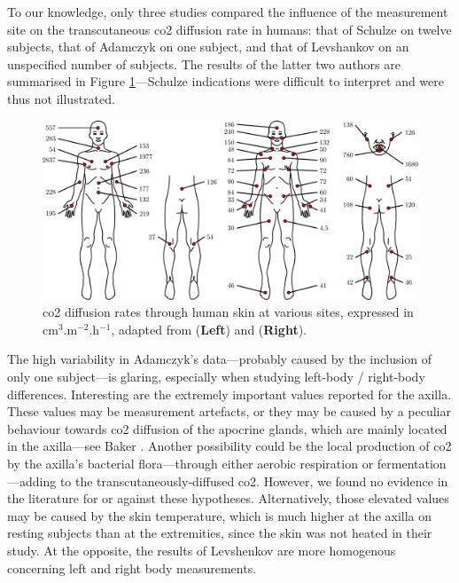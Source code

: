 To our knowledge, only three studies compared the influence of the measurement site on the transcutaneous \gls{co2} diffusion rate in humans: that of Schulze on twelve subjects\cite[Table~16]{schulze1943}, that of Adamczyk \etal{}\cite{adamczyk1966} on one subject, and that of Levshankov \etal{}\cite{levshankov1983} on an unspecified number of subjects. The results of the latter two authors are summarised in Figure \ref{fig:tcco2:positioning}---Schulze indications were difficult to interpret and were thus not illustrated.

\begin{figure}
	\centering
	\includegraphics[width=\linewidth]{1_main_matter/tcco2_figures/positioning.pdf}
	\caption[\gls{co2} diffusion rates through human skin at various sites retrieved from the literature.]{\gls{co2} diffusion rates through human skin at various sites, expressed in cm$^3$.m$^{-2}$.h$^{-1}$, adapted from \cite{adamczyk1966} (\textbf{Left}) and \cite{levshankov1983} (\textbf{Right}).}\label{fig:tcco2:positioning}
\end{figure}

The high variability in Adamczyk's data---probably caused by the inclusion of only one subject---is glaring, especially when studying left-body / right-body differences. Interesting are the extremely important values reported for the axilla. These values may be measurement artefacts, or they may be caused by a peculiar behaviour towards \gls{co2} diffusion of the apocrine glands, which are mainly located in the axilla---see Baker \etal{}\cite{baker2019}. Another possibility could be the local production of \gls{co2} by the axilla's bacterial flora---through either aerobic respiration or fermentation---adding to the transcutaneously-diffused \gls{co2}\cite{taylor2003}. However, we found no evidence in the literature for or against these hypotheses. Alternatively, those elevated values may be caused by the skin temperature, which is much higher at the axilla on resting subjects than at the extremities\cite{niu2001, sund2002}, since the skin was not heated in their study. At the opposite, the results of Levshenkov \etal{} are more homogenous concerning left and right body measurements.


